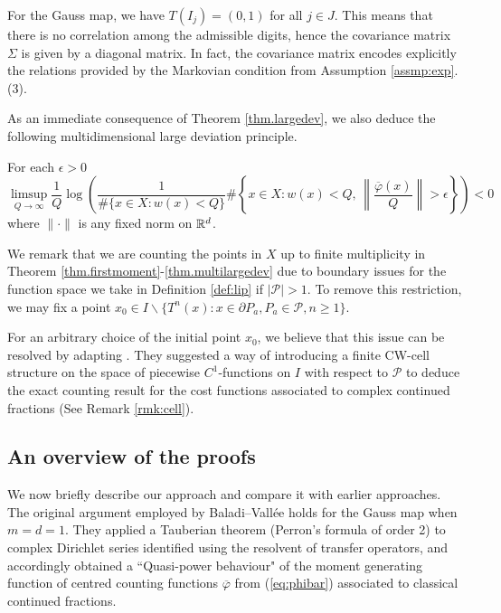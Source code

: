 \documentclass[12pt,a4paper,reqno]{amsart}
\begin{document}
\begin{example}
For the Gauss map, we have $T(I_j)=(0,1)$ for all $j \in J$. This means that there is no correlation among the  admissible digits, hence the covariance matrix $\Sigma$ is given by a diagonal matrix. In fact, the covariance matrix encodes explicitly the relations provided by the Markovian condition from Assumption \ref{assmp:exp}.(3).
\end{example}

As an immediate consequence of Theorem \ref{thm.largedev}, we also deduce the following multidimensional large deviation principle.
\begin{theorem} \label{thm.multilargedev}
For each $\epsilon >0$
\[
\limsup_{Q\to\infty} \frac{1}{Q} \log \left( \frac{1}{\#\{x \in X : w(x) < Q\}} \#\left\{ x\in X: w(x) < Q, \,  \left\| \frac{\overline{\varphi}(x)}{Q} \right\| > \epsilon \right\}\right) < 0
\]
where $\|\cdot\|$ is any fixed norm on ${\mathbb R}^d$.
\end{theorem}

We remark that  we are counting the points in $X$ up to finite multiplicity in Theorem \ref{thm.firstmoment}-\ref{thm.multilargedev} due to boundary issues for the function space we take in Definition \ref{def:lip} if $|\mathcal{P}| >1$. To remove this restriction, we may fix a point $x_0 \in I \backslash \{ T^n(x): x \in \partial P_a, P_a \in \mathcal{P}, n \geq 1 \}$. 

For an arbitrary choice of the initial point $x_0$, we believe that this issue can be resolved by adapting \cite{kim2025}. They suggested a way of introducing a finite CW-cell structure on the space of piecewise $C^1$-functions on $I$ with respect to $\mathcal{P}$ to deduce the exact counting result for the cost functions associated to complex continued fractions (See Remark \ref{rmk:cell}). 

\subsection{An overview of the proofs}\label{sec.overview}

We now briefly describe our approach and compare it with earlier approaches. The original argument employed
 by Baladi--Vall\'ee holds for the Gauss map when $m=d=1$.
They applied a Tauberian theorem (Perron's formula of order 2) to complex Dirichlet series identified using the resolvent of transfer operators, and accordingly obtained a ``Quasi-power behaviour" of the moment generating function of centred counting functions $\overline{\varphi}$  from (\ref{eq:phibar}) associated to classical continued fractions.  
\end{document}
